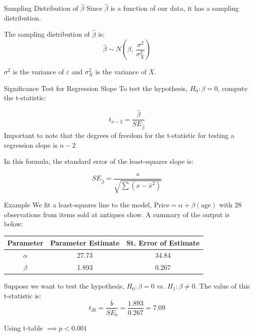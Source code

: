 \documentclass{beamer}
\begin{document}
\begin{frame}{Sampling Distribution of $\hat{\beta}$}
	Since $\hat{\beta}$ is a function of our data, it has a sampling distribution.

	The sampling distribution of $\hat{\beta}$ is:
	\[
		\hat{\beta} \sim N\left(\beta, \ \frac{\sigma^2}{\sigma_X^2}\right)
	\]

	$\sigma^2$ is the variance of $\varepsilon$ and $\sigma_X^2$ is the variance of $X$.

	\vspace{5mm}
	\href{https://www.econometrics-with-r.org/4-5-tsdotoe.html}{}
	
\end{frame}

\begin{frame}{Significance Test for Regression Slope}
	To test the hypothesis, $H_0: \beta=0$, compute the t-statistic:
	
	\[ 
		t_{n-2}=\frac{\hat{\beta}}{SE_{\hat{\beta}}} 
	\]
	Important to note that the degrees of freedom for the t-statistic for testing a regression slope is $n-2$ 
	
	\vspace{5mm}
	In this formula, the standard error of the least-squares slope is:
	
	\[ 
		SE_{\hat{\beta}}=\frac{s}{\sqrt{\sum (x-\bar{x}^2)}} 
	\]
\end{frame}

\begin{frame}{Example}
	We fit a least-squares line to the model, $\text{Price} = \alpha+\beta (\text{age})$ with 28 observations from items sold at antiques show. A summary of the output is below:

	\begin{center}
		\begin{tabular}{|c|c|c|}
			\hline
			\textbf{Parameter} & \textbf{Parameter Estimate} & \textbf{St. Error of Estimate} \\
			\hline
			$\alpha$  & 27.73 & 34.84 \\
			\hline
			$\beta$   & 1.893 & 0.267 \\
			\hline
		\end{tabular}
	\end{center}

	Suppose we want to test the hypothesis, $H_0: \beta=0$ vs. $H_1: \beta \neq 0$. The value of this t-statistic is: \[ 
		t_{26} = \frac{b}{SE_b} = \frac{1.893}{0.267} = 7.09 
	\]

	Using t-table $\implies p < 0.001$
\end{frame}
\end{document}

